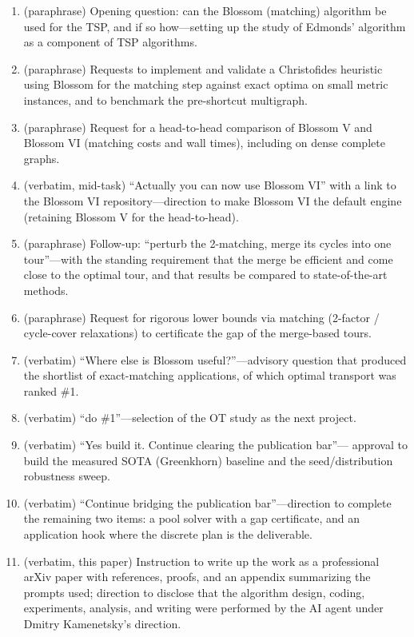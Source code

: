 \documentclass[11pt]{article}
\theoremstyle{remark}
\begin{document}
\begin{enumerate}[leftmargin=2em,itemsep=2pt]
\item (paraphrase) Opening question: can the Blossom (matching) algorithm
be used for the TSP, and if so how---setting up the study of Edmonds'
algorithm as a component of TSP algorithms.
\item (paraphrase) Requests to implement and validate a Christofides
heuristic using Blossom for the matching step against exact optima on small
metric instances, and to benchmark the pre-shortcut multigraph.
\item (paraphrase) Request for a head-to-head comparison of Blossom V and
Blossom VI (matching costs and wall times), including on dense complete
graphs.
\item (verbatim, mid-task) ``Actually you can now use Blossom VI'' with a
link to the Blossom VI repository---direction to make Blossom VI the
default engine (retaining Blossom V for the head-to-head).
\item (paraphrase) Follow-up: ``perturb the 2-matching, merge its cycles
into one tour''---with the standing requirement that the merge be efficient
and come close to the optimal tour, and that results be compared to
state-of-the-art methods.
\item (paraphrase) Request for rigorous lower bounds via matching
(2-factor / cycle-cover relaxations) to certificate the gap of the
merge-based tours.
\item (verbatim) ``Where else is Blossom useful?''---advisory question that
produced the shortlist of exact-matching applications, of which optimal
transport was ranked \#1.
\item (verbatim) ``do \#1''---selection of the OT study as the next project.
\item (verbatim) ``Yes build it. Continue clearing the publication bar''---
approval to build the measured SOTA (Greenkhorn) baseline and the seed/distribution
robustness sweep.
\item (verbatim) ``Continue bridging the publication bar''---direction to
complete the remaining two items: a pool solver with a gap certificate,
and an application hook where the discrete plan is the deliverable.
\item (verbatim, this paper) Instruction to write up the work as a
professional arXiv paper with references, proofs, and an appendix
summarizing the prompts used; direction to disclose that the
algorithm design, coding, experiments, analysis, and writing were
performed by the AI agent under Dmitry Kamenetsky's direction.

\end{enumerate}
\end{document}
